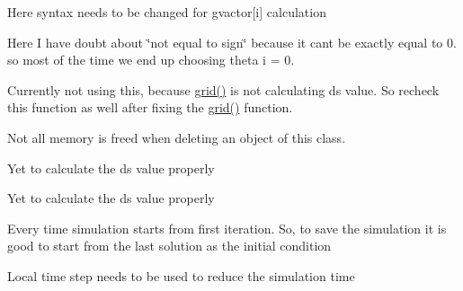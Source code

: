
\begin{DoxyRefList}
\item[\label{bug__bug000001}%
\hypertarget{bug__bug000001}{}%
Member \hyperlink{classdiffusionfluxinterface_a30feb61f31b2c40063fc4ca7ca16258e}{diffusionfluxinterface\+:\+:diffusionfluxinterface} (vector$<$ double $>$ \&Conserved\+Variable\+Left\+Minus, vector$<$ double $>$ \&Conserved\+Variable\+Left, vector$<$ double $>$ \&Conserved\+Variable\+Right, vector$<$ double $>$ \&Conserved\+Variable\+Right\+Plus, vector$<$ double $>$ \&Face\+Area\+Vector\+Left, vector$<$ double $>$ \&Face\+Area\+Vector\+Right, vector$<$ double $>$ \&Face\+Area\+Vector\+Right\+Plus, double Cell\+Volume\+Left\+Mins, double Cell\+Volume\+Left, double Cell\+Volume\+Right, double Cell\+Volume\+Right\+Plus, double DeltaT)]Here syntax needs to be changed for gvactor\mbox{[}i\mbox{]} calculation 

Here I have doubt about \char`\"{}not equal to sign\char`\"{} because it can\textquotesingle{}t be exactly equal to 0. so most of the time we end up choosing theta i = 0.  
\item[\label{bug__bug000003}%
\hypertarget{bug__bug000003}{}%
File \hyperlink{dt_8h}{dt.h} ]Currently not using this, because \hyperlink{grid__nozzle_8h_a6cdf5cf168063009e847db46d6624c1b}{grid()} is not calculating ds value. So recheck this function as well after fixing the \hyperlink{grid__nozzle_8h_a6cdf5cf168063009e847db46d6624c1b}{grid()} function.  
\item[\label{bug__bug000004}%
\hypertarget{bug__bug000004}{}%
File \hyperlink{eulerflux_8h}{eulerflux.h} ]Not all memory is freed when deleting an object of this class.  
\item[\label{bug__bug000005}%
\hypertarget{bug__bug000005}{}%
Member \hyperlink{run_8h_ac7609273a01eb63ff8a25ddf1aafeff7}{grid} (vector$<$ vector$<$ vector$<$ vector$<$ double $>$ $>$ $>$ $>$ \&i\+Face\+Area\+Vector, vector$<$ vector$<$ vector$<$ vector$<$ double $>$ $>$ $>$ $>$ \&j\+Face\+Area\+Vector, vector$<$ vector$<$ vector$<$ vector$<$ double $>$ $>$ $>$ $>$ \&k\+Face\+Area\+Vector, vector$<$ vector$<$ vector$<$ double $>$ $>$ $>$ \&Cell\+Volume, vector$<$ vector$<$ vector$<$ double $>$ $>$ $>$ \&delta\+\_\+s, int \&Ni, int \&Nj, int \&Nk)]Yet to calculate the ds value properly  
\item[\label{bug__bug000005}%
\hypertarget{bug__bug000005}{}%
Member \hyperlink{run_8h_ac7609273a01eb63ff8a25ddf1aafeff7}{grid} (vector$<$ vector$<$ vector$<$ vector$<$ double $>$ $>$ $>$ $>$ \&i\+Face\+Area\+Vector, vector$<$ vector$<$ vector$<$ vector$<$ double $>$ $>$ $>$ $>$ \&j\+Face\+Area\+Vector, vector$<$ vector$<$ vector$<$ vector$<$ double $>$ $>$ $>$ $>$ \&k\+Face\+Area\+Vector, vector$<$ vector$<$ vector$<$ double $>$ $>$ $>$ \&Cell\+Volume, vector$<$ vector$<$ vector$<$ double $>$ $>$ $>$ \&delta\+\_\+s, int \&Ni, int \&Nj, int \&Nk)]Yet to calculate the ds value properly  
\item[\label{bug__bug000006}%
\hypertarget{bug__bug000006}{}%
Member \hyperlink{run_8h_a13a43e6d814de94978c515cb084873b1}{run} ()]Every time simulation starts from first iteration. So, to save the simulation it is good to start from the last solution as the initial condition 

Local time step needs to be used to reduce the simulation time 
\end{DoxyRefList}